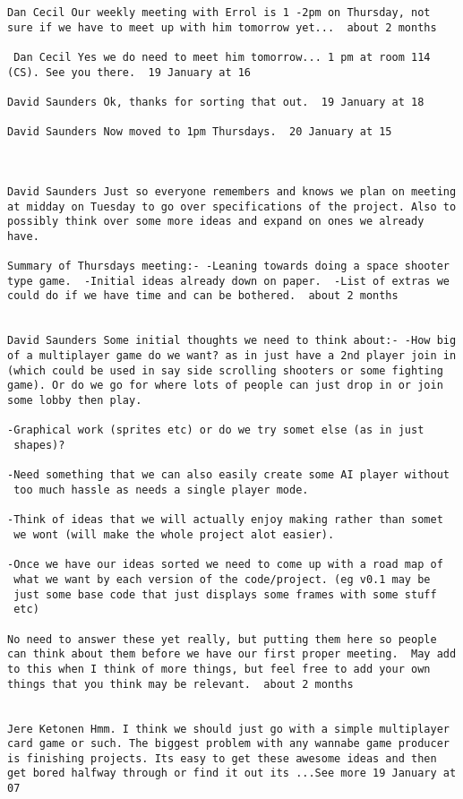 \begin{verbatim}
Dan Cecil Our weekly meeting with Errol is 1 -2pm on Thursday, not
sure if we have to meet up with him tomorrow yet...  about 2 months

 Dan Cecil Yes we do need to meet him tomorrow... 1 pm at room 114
(CS). See you there.  19 January at 16

David Saunders Ok, thanks for sorting that out.  19 January at 18

David Saunders Now moved to 1pm Thursdays.  20 January at 15



David Saunders Just so everyone remembers and knows we plan on meeting
at midday on Tuesday to go over specifications of the project. Also to
possibly think over some more ideas and expand on ones we already
have.

Summary of Thursdays meeting:- -Leaning towards doing a space shooter
type game.  -Initial ideas already down on paper.  -List of extras we
could do if we have time and can be bothered.  about 2 months 


David Saunders Some initial thoughts we need to think about:- -How big
of a multiplayer game do we want? as in just have a 2nd player join in
(which could be used in say side scrolling shooters or some fighting
game). Or do we go for where lots of people can just drop in or join
some lobby then play.

-Graphical work (sprites etc) or do we try somet else (as in just
 shapes)?

-Need something that we can also easily create some AI player without
 too much hassle as needs a single player mode.

-Think of ideas that we will actually enjoy making rather than somet
 we wont (will make the whole project alot easier).

-Once we have our ideas sorted we need to come up with a road map of
 what we want by each version of the code/project. (eg v0.1 may be
 just some base code that just displays some frames with some stuff
 etc)

No need to answer these yet really, but putting them here so people
can think about them before we have our first proper meeting.  May add
to this when I think of more things, but feel free to add your own
things that you think may be relevant.  about 2 months 
 

Jere Ketonen Hmm. I think we should just go with a simple multiplayer
card game or such. The biggest problem with any wannabe game producer
is finishing projects. Its easy to get these awesome ideas and then
get bored halfway through or find it out its ...See more 19 January at
07


\end{verbatim}
